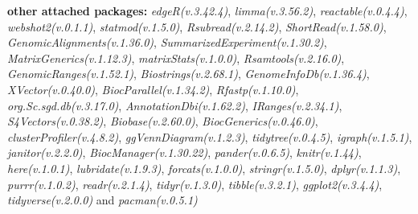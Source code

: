 \documentclass[
]{book}
\begin{document}
\textbf{other attached packages:}
\emph{edgeR(v.3.42.4)}, \emph{limma(v.3.56.2)}, \emph{reactable(v.0.4.4)}, \emph{webshot2(v.0.1.1)}, \emph{statmod(v.1.5.0)}, \emph{Rsubread(v.2.14.2)}, \emph{ShortRead(v.1.58.0)}, \emph{GenomicAlignments(v.1.36.0)}, \emph{SummarizedExperiment(v.1.30.2)}, \emph{MatrixGenerics(v.1.12.3)}, \emph{matrixStats(v.1.0.0)}, \emph{Rsamtools(v.2.16.0)}, \emph{GenomicRanges(v.1.52.1)}, \emph{Biostrings(v.2.68.1)}, \emph{GenomeInfoDb(v.1.36.4)}, \emph{XVector(v.0.40.0)}, \emph{BiocParallel(v.1.34.2)}, \emph{Rfastp(v.1.10.0)}, \emph{org.Sc.sgd.db(v.3.17.0)}, \emph{AnnotationDbi(v.1.62.2)}, \emph{IRanges(v.2.34.1)}, \emph{S4Vectors(v.0.38.2)}, \emph{Biobase(v.2.60.0)}, \emph{BiocGenerics(v.0.46.0)}, \emph{clusterProfiler(v.4.8.2)}, \emph{ggVennDiagram(v.1.2.3)}, \emph{tidytree(v.0.4.5)}, \emph{igraph(v.1.5.1)}, \emph{janitor(v.2.2.0)}, \emph{BiocManager(v.1.30.22)}, \emph{pander(v.0.6.5)}, \emph{knitr(v.1.44)}, \emph{here(v.1.0.1)}, \emph{lubridate(v.1.9.3)}, \emph{forcats(v.1.0.0)}, \emph{stringr(v.1.5.0)}, \emph{dplyr(v.1.1.3)}, \emph{purrr(v.1.0.2)}, \emph{readr(v.2.1.4)}, \emph{tidyr(v.1.3.0)}, \emph{tibble(v.3.2.1)}, \emph{ggplot2(v.3.4.4)}, \emph{tidyverse(v.2.0.0)} and \emph{pacman(v.0.5.1)}
\end{document}
